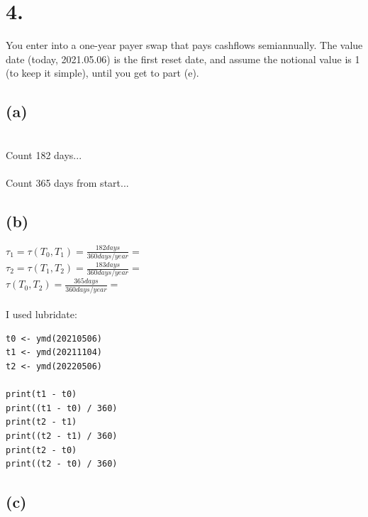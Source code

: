 \documentclass{article}
\begin{document}
\section*{4.}
{\Large 

You enter into a one-year payer swap that pays cashflows semiannually. The value date (today, 2021.05.06) is the first reset date, and assume the notional value is 1 (to keep it simple), until you get to part (e).

\subsection*{(a)}

 \\ 
Count 182 days... \\  
 \\
Count 365 days from start... \\

\subsection*{(b)}

$\tau_1 = \tau(T_0, T_1) = \frac{182 days}{360 days / year} = $  \\
$\tau_2 = \tau(T_1, T_2) = \frac{183 days}{360 days / year} = $  \\
$\tau(T_0, T_2) = \frac{365 days}{360 days / year} = $  \\ \\
I used lubridate:
\begin{verbatim}
t0 <- ymd(20210506)
t1 <- ymd(20211104)
t2 <- ymd(20220506)

print(t1 - t0)
print((t1 - t0) / 360)
print(t2 - t1)
print((t2 - t1) / 360)
print(t2 - t0)
print((t2 - t0) / 360)
\end{verbatim}

\subsection*{(c)}

}
\end{document}
